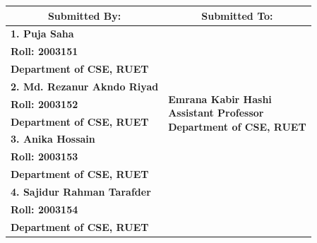\documentclass[12pt,a4paper]{article}
\begin{document}
\begin{titlepage}
    
    \begin{table}[h!]
    \centering
    \setlength{\arrayrulewidth}{1.5pt}
    \renewcommand{\arraystretch}{1.3}
    \begin{tabular}{|p{7.5cm}|p{7.5cm}|}
        \hline
        \multicolumn{1}{|c|}{\large \textbf{Submitted By:}} & \multicolumn{1}{c|}{\large \textbf{Submitted To:}} \\
        \hline
        \large \textbf{1. Puja Saha} & \multirow{10}{*}{\parbox{7.5cm}{\centering 
        \large \textbf{Emrana Kabir Hashi} \\ 
        \vspace{0.1cm}
        \textbf{Assistant Professor} \\ 
        \vspace{0.1cm}
        \textbf{Department of CSE, RUET}}} \\
        \large \quad \textbf{\hspace{0.2cm}Roll: 2003151} & \\
        \large \quad \textbf{\hspace{0.2cm}Department of CSE, RUET} & \\
        \cline{1-1}
        \large \textbf{2. Md. Rezanur Akndo Riyad} & \\
        \large \quad \textbf{\hspace{0.2cm}Roll: 2003152} & \\
        \large \quad \textbf{\hspace{0.2cm}Department of CSE, RUET} & \\
        \cline{1-1}
        \large \textbf{3. Anika Hossain} & \\
        \large \quad \textbf{\hspace{0.2cm}Roll: 2003153} & \\
        \large \quad \textbf{\hspace{0.2cm}Department of CSE, RUET} & \\
        \cline{1-1}
        \large \textbf{4. Sajidur Rahman Tarafder} & \\
        \large \quad \textbf{\hspace{0.2cm}Roll: 2003154} & \\
        \large \quad \textbf{\hspace{0.2cm}Department of CSE, RUET} & \\
        \hline
        
    \end{tabular}
    \end{table}
    
    \vspace{0.5cm}

\end{titlepage}
\end{document}
